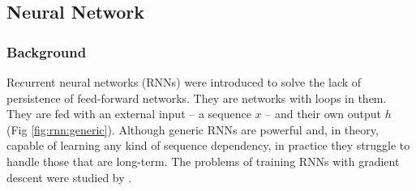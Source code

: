 \subsection{Neural Network}\label{sec:nn}

\subsubsection{Background}

Recurrent neural networks (RNNs) were introduced to solve the lack of persistence of feed-forward networks. They are networks with loops in them. They are fed with an external input -- a sequence $x$ -- and their own output $h$ (Fig \ref{fig:rnn:generic}). Although generic RNNs are powerful and, in theory, capable of learning any kind of sequence dependency, in practice they struggle to handle those that are long-term. The problems of training RNNs with gradient descent were studied by .

